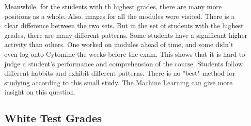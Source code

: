 \documentclass[a4paper,11pt]{report}
\numberwithin{figure}{section} %
\begin{document}
    Meanwhile, for the students with th highest grades, there are many more positions as a whole.
    Also, images for all the modules were visited.
    There is a clear difference between the two sets.
    But in the set of students with the highest grades, there are many different patterns.
    Some students have a significant higher activity than others.
    One worked on modules ahead of time, and some didn't even log onto Cytomine the weeks before the exam.
    This shows that it is hard to judge a student's performance and comprehension of the course.
    Students follow different habbits and exhibit different patterns.
    There is no "best" method for studying according to this small study.
    The Machine Learning can give more insight on this question.



    \subsection{White Test Grades}
\end{document}
